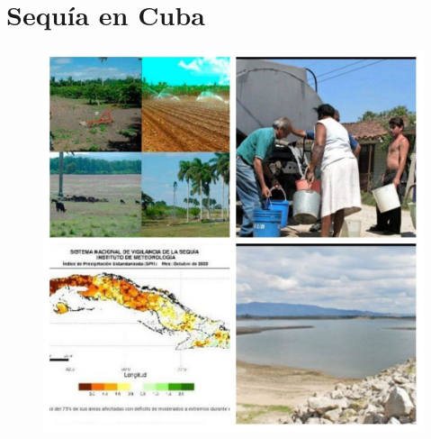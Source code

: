 \documentclass[12pt]{article}
\begin{document}
	\section{Sequía en Cuba}
    \begin{figure}
		\centering
		\includegraphics[width=0.7\linewidth]{images/9.jpg}
	\end{figure}
\end{document}
